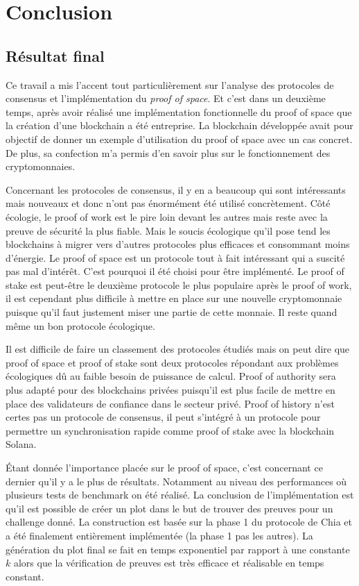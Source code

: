 \chapter{Conclusion}

\section{Résultat final}

Ce travail a mis l'accent tout particulièrement sur l'analyse des protocoles de consensus et l'implémentation du \emph{proof of space}. Et c'est dans un deuxième temps, après avoir réalisé une implémentation fonctionnelle du proof of space que la création d'une blockchain a été entreprise. La blockchain développée avait pour objectif de donner un exemple d'utilisation du proof of space avec un cas concret. De plus, sa confection m'a permis d'en savoir plus sur le fonctionnement des cryptomonnaies.

Concernant les protocoles de consensus, il y en a beaucoup qui sont intéressants mais nouveaux et donc n'ont pas énormément été utilisé concrètement. Côté écologie, le proof of work est le pire loin devant les autres mais reste avec la preuve de sécurité la plus fiable. Mais le soucis écologique qu'il pose tend les blockchains à migrer vers d'autres protocoles plus efficaces et consommant moins d'énergie. Le proof of space est un protocole tout à fait intéressant qui a suscité pas mal d'intérêt. C'est pourquoi il été choisi pour être implémenté. Le proof of stake est peut-être le deuxième protocole le plus populaire après le proof of work, il est cependant plus difficile à mettre en place sur une nouvelle cryptomonnaie puisque qu'il faut justement miser une partie de cette monnaie. Il reste quand même un bon protocole écologique.

Il est difficile de faire un classement des protocoles étudiés mais on peut dire que proof of space et proof of stake sont deux protocoles répondant aux problèmes écologiques dû au faible besoin de puissance de calcul. Proof of authority sera plus adapté pour des blockchains privées puisqu'il est plus facile de mettre en place des validateurs de confiance dans le secteur privé. Proof of history n'est certes pas un protocole de consensus, il peut s'intégré à un protocole pour permettre un synchronisation rapide comme proof of stake avec la blockchain Solana.

Étant donnée l'importance placée sur le proof of space, c'est concernant ce dernier qu'il y a le plus de résultats. Notamment au niveau des performances où plusieurs tests de benchmark on été réalisé. La conclusion de l'implémentation est qu'il est possible de créer un plot dans le but de trouver des preuves pour un challenge donné. La construction est basée sur la phase 1 du protocole de Chia \cite{chia:construction} et a été finalement entièrement implémentée (la phase 1 pas les autres). La génération du plot final se fait en temps exponentiel par rapport à une constante $k$ alors que la vérification de preuves est très efficace et réalisable en temps constant.

